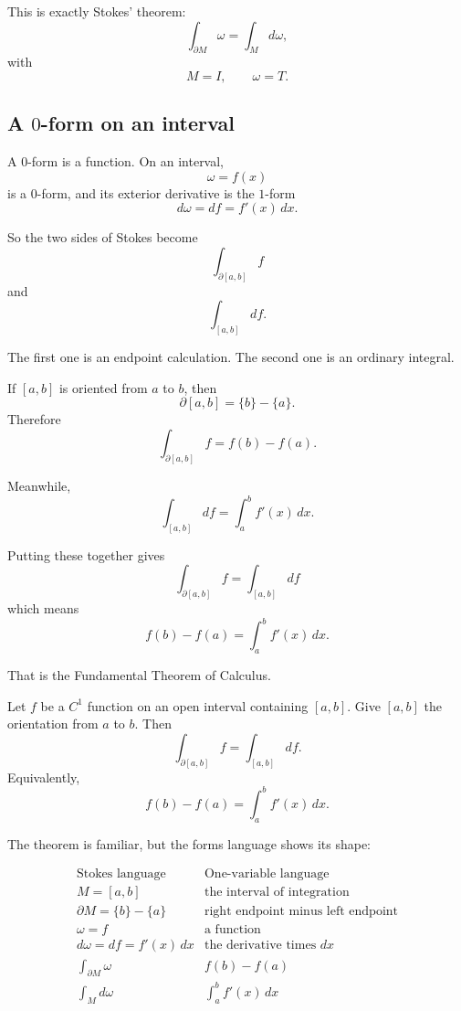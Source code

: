 This is exactly Stokes' theorem:
\[
    \int_{\partial M}\omega=\int_M d\omega,
\]
with
\[
    M=I,
    \qquad
    \omega=T.
\]

\subsection{A \(0\)-form on an interval}

A \(0\)-form is a function.  On an interval,
\[
    \omega=f(x)
\]
is a \(0\)-form, and its exterior derivative is the \(1\)-form
\[
\boxed{
    d\omega=df=f'(x)\,dx.
}
\]

So the two sides of Stokes become
\[
    \int_{\partial[a,b]}f
\]
and
\[
    \int_{[a,b]}df.
\]

The first one is an endpoint calculation.  The second one is an ordinary integral.

If \([a,b]\) is oriented from \(a\) to \(b\), then
\[
    \partial[a,b]=\{b\}-\{a\}.
\]
Therefore
\[
\boxed{
    \int_{\partial[a,b]}f=f(b)-f(a).
}
\]

Meanwhile,
\[
\boxed{
    \int_{[a,b]}df=\int_a^b f'(x)\,dx.
}
\]

Putting these together gives
\[
\boxed{
    \int_{\partial[a,b]}f=\int_{[a,b]}df
}
\]
which means
\[
\boxed{
    f(b)-f(a)=\int_a^b f'(x)\,dx.
}
\]

That is the Fundamental Theorem of Calculus.

\begin{theorem}
Let \(f\) be a \(C^1\) function on an open interval containing \([a,b]\).  Give
\([a,b]\) the orientation from \(a\) to \(b\).  Then
\[
\boxed{
    \int_{\partial[a,b]}f=\int_{[a,b]}df.
}
\]
Equivalently,
\[
\boxed{
    f(b)-f(a)=\int_a^b f'(x)\,dx.
}
\]
\end{theorem}

The theorem is familiar, but the forms language shows its shape:

\[
\begin{array}{c|c}
\text{Stokes language} & \text{One-variable language} \\ \hline
M=[a,b] & \text{the interval of integration}\\[1mm]
\partial M=\{b\}-\{a\} & \text{right endpoint minus left endpoint}\\[1mm]
\omega=f & \text{a function}\\[1mm]
d\omega=df=f'(x)\,dx & \text{the derivative times }dx\\[1mm]
\displaystyle\int_{\partial M}\omega & f(b)-f(a)\\[3mm]
\displaystyle\int_M d\omega & \displaystyle\int_a^b f'(x)\,dx
\end{array}
\]


